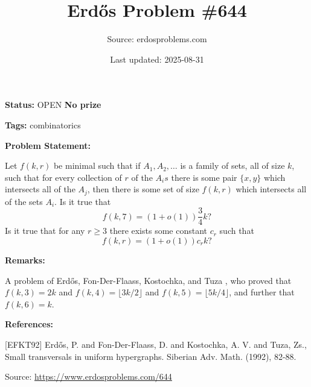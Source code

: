 \documentclass{article}
\title{Erd\H{o}s Problem \#644}
\date{Last updated: 2025-08-31}
\author{Source: erdosproblems.com}
\begin{document}
\maketitle

\noindent\textbf{Status:} OPEN \quad \textbf{No prize}

\noindent\textbf{Tags:} combinatorics

\medskip
\noindent\textbf{Problem Statement:}

Let $f(k,r)$ be minimal such that if $A_1,A_2,\ldots$ is a family of sets, all of size $k$, such that for every collection of $r$ of the $A_is$ there is some pair $\{x,y\}$ which intersects all of the $A_j$, then there is some set of size $f(k,r)$ which intersects all of the sets $A_i$. Is it true that\[f(k,7)=(1+o(1))\frac{3}{4}k?\]Is it true that for any $r\geq 3$ there exists some constant $c_r$ such that\[f(k,r)=(1+o(1))c_rk?\]

\bigskip
\noindent\textbf{Remarks:}

A problem of Erd\H{o}s, Fon-Der-Flaass, Kostochka, and Tuza \cite{EFKT92}, who proved that $f(k,3)=2k$ and $f(k,4)=\lfloor 3k/2\rfloor$ and $f(k,5)=\lfloor 5k/4\rfloor$, and further that $f(k,6)=k$.

\bigskip
\noindent\textbf{References:}

[EFKT92] Erd\H{o}s, P. and Fon-Der-Flaass, D. and Kostochka, A. V. and
Tuza, Zs., Small transversals in uniform hypergraphs. Siberian Adv. Math. (1992), 82-88.

\bigskip
\noindent\small{Source: \url{https://www.erdosproblems.com/644}}
\end{document}
